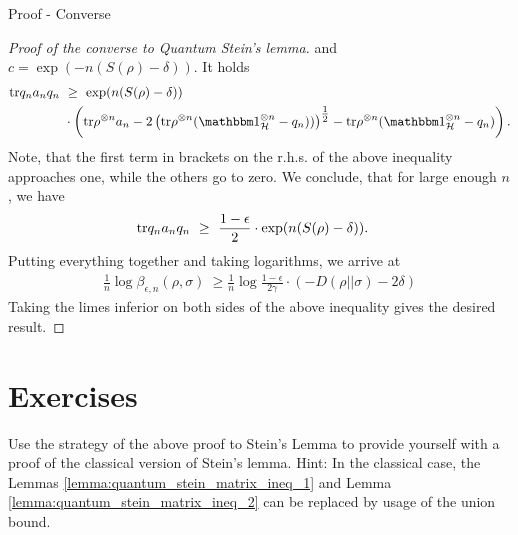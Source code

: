 \begin{subsection}{Proof - Converse}
\begin{proof}[Proof of the converse to Quantum Stein's lemma]
  and $c = \exp(-n(S(\rho) - \delta))$. It holds
  \begin{align*}
   \tr q_n a_n q_n \ &\geq \ \exp(n(S(\rho) - \delta))  \\
			    & \cdot \left(\tr \rho^{\otimes n} a_n  - 2 \left(\tr \rho^{\otimes n}(\bbmeins_{\cH}^{\otimes n} - q_n))\right)^{\tfrac{1}{2}} - \tr \rho^{\otimes n} 
   (\bbmeins_\cH^{\otimes n} - q_{n})\right).
  \end{align*}
  Note, that the first term in brackets on the r.h.s. of the above inequality approaches one, while the others go to zero. We conclude, that for large enough $n$, we have
  \begin{align*}
  \mathrm{tr} q_n a_n q_n  \ &\geq \ \frac{1- \epsilon}{2} \cdot \exp(n(S(\rho) - \delta)).
  \end{align*}
  Putting everything together and taking logarithms, we arrive at 
  \begin{align*}
   \frac{1}{n} \log \beta_{\epsilon, n}(\rho, \sigma) \ \geq    \frac{1}{n} \log\frac{1- \epsilon}{2\gamma} \cdot (-D(\rho||\sigma) - 2 \delta)
  \end{align*}
  Taking the limes inferior on both sides of the above inequality gives the desired result.
  \end{proof} 
  \end{subsection}
  \section{Exercises}
  
  \begin{exercise}
   Use the strategy of the above proof to Stein's Lemma to provide yourself with a proof of the classical version of Stein's lemma. Hint: In the classical case, the Lemmas \ref{lemma:quantum_stein_matrix_ineq_1} and 
   Lemma \ref{lemma:quantum_stein_matrix_ineq_2} can be replaced by usage of the union
    bound.
  \end{exercise}
  








